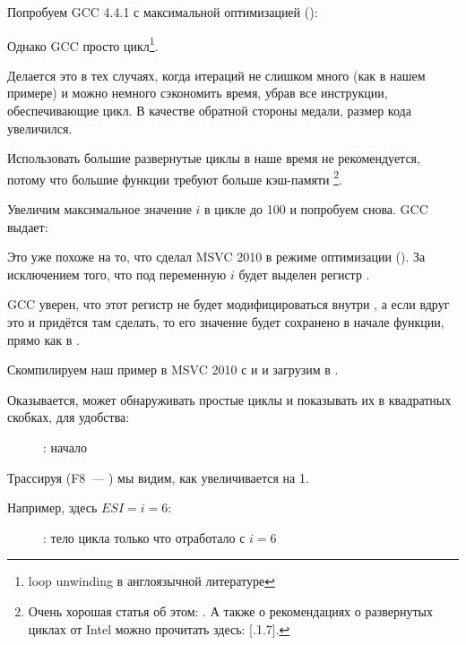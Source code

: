 Попробуем GCC 4.4.1 с максимальной оптимизацией (\Othree):



Однако GCC просто  цикл\footnote{\gls{loop unwinding} в англоязычной литературе}.

Делается это в тех случаях, когда итераций не слишком много (как в нашем примере)
и можно немного сэкономить время, убрав все инструкции, обеспечивающие цикл. 
В качестве обратной стороны медали, размер кода увеличился.

Использовать большие развернутые циклы в наше время не рекомендуется, потому что большие
функции требуют больше кэш-памяти%
\footnote{Очень хорошая статья об этом: \DrepperMemory.
А также о рекомендациях о развернутых циклах от Intel можно прочитать здесь: 
[.1.7].}.

Увеличим максимальное значение $i$ в цикле до 100 и попробуем снова. GCC выдает:



Это уже похоже на то, что сделал MSVC 2010 в режиме оптимизации (\TT{\Ox}).
За исключением того, что под переменную $i$ будет выделен регистр \EBX.

GCC уверен, что этот регистр не будет 
модифицироваться внутри \ttf, а если вдруг это и придётся там сделать, то его значение будет сохранено 
в начале функции, прямо как в \main.

\clearpage
{}
\myindex{\olly}

Скомпилируем наш пример в MSVC 2010 с \Ox и \Obzero и загрузим в \olly.

Оказывается, \olly может обнаруживать простые циклы и показывать их в квадратных скобках, 
для удобства:

\begin{figure}[H]
\centering
{}
\caption{\olly: начало \main}
\label{fig:loops_olly_1}
\end{figure}

Трассируя (F8~--- \stepover) мы видим, как \ESI увеличивается на 1.

Например, здесь $ESI=i=6$:

\begin{figure}[H]
\centering
{}
\caption{\olly: тело цикла только что отработало с $i=6$}
\label{fig:loops_olly_2}
\end{figure}

